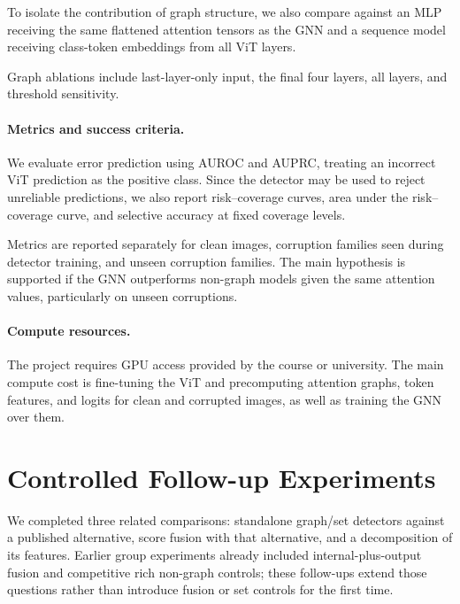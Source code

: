 To isolate the contribution of graph structure, we also compare against
an MLP receiving the same flattened attention tensors as the GNN and a
sequence model receiving class-token embeddings from all ViT layers.

Graph ablations include last-layer-only input, the final four layers,
all layers, and threshold sensitivity.

\paragraph{Metrics and success criteria.}
We evaluate error prediction using AUROC and AUPRC, treating an
incorrect ViT prediction as the positive class. Since the detector may
be used to reject unreliable predictions, we also report
risk--coverage curves, area under the risk--coverage curve, and
selective accuracy at fixed coverage levels.

Metrics are reported separately for clean images, corruption families
seen during detector training, and unseen corruption families. The main
hypothesis is supported if the GNN outperforms non-graph models given
the same attention values, particularly on unseen corruptions.

\paragraph{Compute resources.}
The project requires GPU access provided by the course or university. The
main compute cost is fine-tuning the ViT and precomputing attention graphs,
token features, and logits for clean and corrupted images, as well as training the GNN over them.

\section{Controlled Follow-up Experiments}
\label{sec:followups}

We completed three related comparisons: standalone graph/set detectors
against a published alternative, score fusion with that alternative, and a
decomposition of its features. Earlier group experiments already included
internal-plus-output fusion and competitive rich non-graph controls; these
follow-ups extend those questions rather than introduce fusion or set
controls for the first time.

